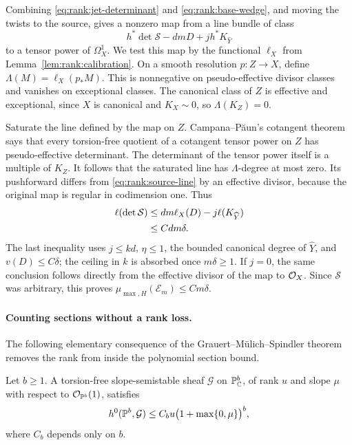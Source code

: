 Combining \eqref{eq:rank:jet-determinant} and
\eqref{eq:rank:base-wedge}, and moving the twists to the source, gives a
nonzero map from a line bundle of class
\begin{equation}\label{eq:rank:source-line}
  h^*\det\mathcal S-dmD+jh^*K_{\widehat Y}
\end{equation}
to a tensor power of $\Omega_X^1$.  We test this map by the functional
$\ell_X$ from Lemma~\ref{lem:rank:calibration}.  On a smooth resolution
$p:Z\to X$, define $\Lambda(M)=\ell_X(p_*M)$.  This is nonnegative on
pseudo-effective divisor classes and vanishes on exceptional classes.
The canonical class of $Z$ is effective and exceptional, since $X$ is
canonical and $K_X\sim0$, so $\Lambda(K_Z)=0$.

Saturate the line defined by the map on $Z$.  Campana--P\u{a}un's
cotangent theorem \cite[Theorem~1.3]{CP2019} says that every torsion-free
quotient of a cotangent tensor power on $Z$ has pseudo-effective
determinant.  The determinant of the tensor power itself is a multiple
of $K_Z$.  It follows that the saturated line has $\Lambda$-degree at
most zero.  Its pushforward differs from \eqref{eq:rank:source-line}
by an effective divisor, because the original map is regular in
codimension one.  Thus
\begin{align}
  \ell(\det\mathcal S)
   &\le dm\ell_X(D)-j\ell(K_{\widehat Y})
        \notag\\
   &\le Cdm\delta.\label{eq:rank:slope-bound}
\end{align}
The last inequality uses $j\le kd$, $\eta\le1$, the bounded canonical
degree of $\widehat Y$, and $v(D)\le C\delta$; the ceiling in $k$ is
absorbed once $m\delta\ge1$.  If $j=0$, the same conclusion follows
directly from the effective divisor of the map to $\mathcal O_X$.
Since $\mathcal S$ was arbitrary, this proves
$\mu_{\max,H}(\mathcal E_m)\le Cm\delta$.

\paragraph{Counting sections without a rank loss.}
The following elementary consequence of the Grauert--M\"ulich--Spindler theorem
removes the rank from inside the polynomial section bound.

\begin{lemma}\label{lem:rank:section-count}
Let $b\ge1$.  A torsion-free slope-semistable sheaf $\mathcal G$ on
$\mathbb P^b_{\mathbb C}$, of rank $u$ and slope $\mu$ with respect to
$\mathcal O_{\mathbb P^b}(1)$, satisfies
\[
  h^0(\mathbb P^b,\mathcal G)
    \le C_bu\bigl(1+\max\{0,\mu\}\bigr)^b,
\]
where $C_b$ depends only on $b$.
\end{lemma}

